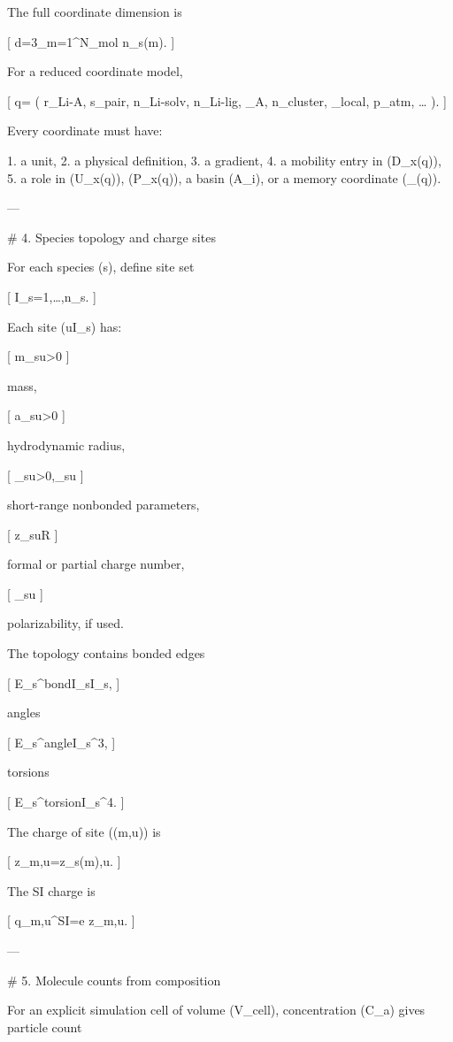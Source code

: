 The full coordinate dimension is

[
d=3\sum_{m=1}^{N_{\rm mol}} n_{s(m)}.
]

For a reduced coordinate model,

[
q=
\left(
r_{\rm Li-A},
s_{\rm pair},
n_{\rm Li-solv},
n_{\rm Li-lig},
\omega_{\rm A},
n_{\rm cluster},
\rho_{\rm local},
p_{\rm atm},
\ldots
\right).
]

Every coordinate must have:

1. a unit,
2. a physical definition,
3. a gradient,
4. a mobility entry in (D_x(q)),
5. a role in (U_x(q)), (P_x(q)), a basin (A_i), or a memory coordinate (\psi_\alpha(q)).

---

# 4. Species topology and charge sites

For each species (s), define site set

[
\mathcal I_s={1,\ldots,n_s}.
]

Each site (u\in \mathcal I_s) has:

[
m_{su}>0
]

mass,

[
a_{su}>0
]

hydrodynamic radius,

[
\sigma_{su}>0,\qquad \epsilon_{su}
]

short-range nonbonded parameters,

[
z_{su}\in\mathbb R
]

formal or partial charge number,

[
\alpha_{su}
]

polarizability, if used.

The topology contains bonded edges

[
\mathcal E_s^{\rm bond}\subset\mathcal I_s\times\mathcal I_s,
]

angles

[
\mathcal E_s^{\rm angle}\subset\mathcal I_s^3,
]

torsions

[
\mathcal E_s^{\rm torsion}\subset\mathcal I_s^4.
]

The charge of site ((m,u)) is

[
z_{m,u}=z_{s(m),u}.
]

The SI charge is

[
q_{m,u}^{\rm SI}=e z_{m,u}.
]

---

# 5. Molecule counts from composition

For an explicit simulation cell of volume (V_{\rm cell}), concentration (C_a) gives particle count

